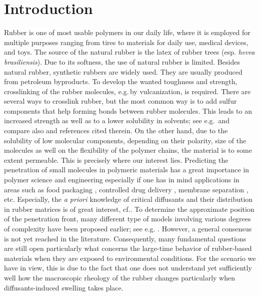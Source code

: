 \documentclass{article}
\begin{document}
\section{Introduction}



Rubber is one of most usable polymers in our daily life, where it
is employed for multiple purposes ranging from tires to materials for daily use,  medical devices, and toys. The source of the natural rubber is  the latex of rubber trees (esp. {\em hevea brasiliensis}). Due to its softness, the use of natural rubber is limited. Besides natural rubber, synthetic rubbers are widely used. They are usually produced from petroleum byproducts. To develop the wanted toughness and strength, crosslinking of the rubber molecules, e.g.\,by vulcanization, is required.  There are several ways to crosslink rubber, but the most common way is to add sulfur components that help forming bonds  between rubber molecules. This leads to  an increased strength as well as  to a lower solubility in solvents; see e.g.\,\cite{morton2013rubber} and compare also \cite{sombatsompop2000effects} and references cited therein. On the other hand, due to the solubility of low molecular components, depending on their polarity, size of the molecules as well on the flexibility of the polymer chains,  the material is to some extent permeable. This is precisely where our interest lies. Predicting the penetration of small molecules in polymeric materials  has a great importance in polymer science and engineering especially if one has in mind applications in areas such as food packaging \cite{reynier2002migration}, controlled drug delivery \cite{mircioiu2019mathematical}, membrane separation \cite{van1992diffusional}, etc.  Especially, the {\em a priori}  knowledge of critical diffusants and their distribution in rubber matrices is of great interest,  cf.\cite{Giese2000,Giese1998,Rosca2004,Rosca2006}.
To determine  the approximate position of the  penetration front, many different type of models involving various degrees of complexity have been proposed earlier; see e.g. \cite{Fasano, masoodi2012numerical, neff2019modelling, Hans, Wilmers}. However, a general consensus is not yet reached in the literature. Consequently, many fundamental questions are still open particularly what concerns the large-time behavior of rubber-based materials when they are exposed to environmental conditions. For the scenario we have in view, this is due to the fact that one does not understand yet sufficiently well how the macroscopic rheology of the rubber changes particularly when diffusants-induced swelling takes place.   
\end{document}
